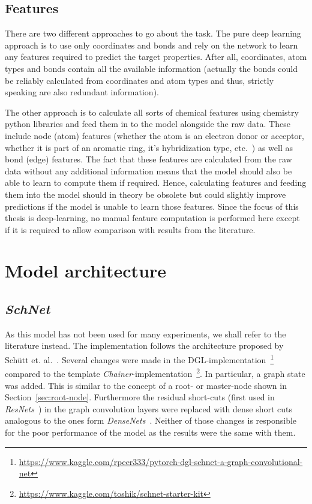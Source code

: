 \subsection{Features}
\label{sec:features}

There are two different approaches to go about the task. The pure deep learning approach is to use only coordinates and bonds and rely on the network to learn any features required to predict the target properties. After all, coordinates, atom types and bonds contain all the available information (actually the bonds could be reliably calculated from coordinates and atom types and thus, strictly speaking are also redundant information).

The other approach is to calculate all sorts of chemical features using chemistry python libraries and feed them in to the model alongside the raw data. These include node (atom) features (whether the atom is an electron donor or acceptor, whether it is part of an aromatic ring, it's hybridization type, etc.~\cite{Organic-chemistry}) as well as bond (edge) features. The fact that these features are calculated from the raw data without any additional information means that the model should also be able to learn to compute them if required. Hence, calculating features and feeding them into the model should in theory be obsolete but could slightly improve predictions if the model is unable to learn those features. Since the focus of this thesis is deep-learning, no manual feature computation is performed here except if it is required to allow comparison with results from the literature.


\section{Model architecture}
\label{sec:architecture}

\subsection{\textit{SchNet}}
\label{sec:schnet-architecture}

As this model has not been used for many experiments, we shall refer to the literature instead. The implementation follows the architecture proposed by Schütt et. al.~\cite{Schutt2017}. Several changes were made in the DGL-implementation~\footnote{\url{https://www.kaggle.com/rpeer333/pytorch-dgl-schnet-a-graph-convolutional-net}} compared to the template \textit{Chainer}-implementation~\footnote{\url{https://www.kaggle.com/toshik/schnet-starter-kit}}. In particular, a graph state was added. This is similar to the concept of a root- or master-node shown in Section~\ref{sec:root-node}. Furthermore the residual short-cuts (first used in \textit{ResNets}~\cite{Sun2016}) in the graph convolution layers were replaced with dense short cuts analogous to the ones form \textit{DenseNets}~\cite{Huang2017}. Neither of those changes is responsible for the poor performance of the model as the results were the same with them.



